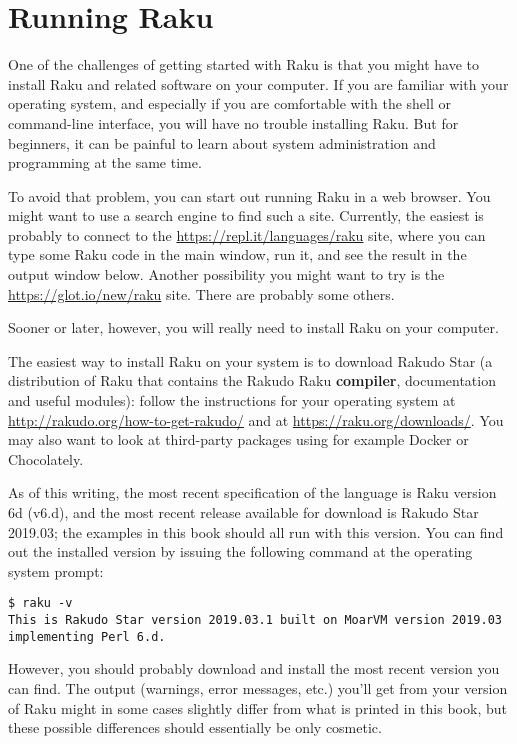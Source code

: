 \section{Running Raku}
\label{running_raku}

One of the challenges of getting started with Raku is that you
might have to install Raku and related software on your computer. 
If you are familiar with your operating system, and especially
if you are comfortable with the shell or command-line interface, 
you will have no trouble installing Raku.  But for beginners, 
it can be painful to learn about system administration and 
programming at the same time.

To avoid that problem, you can start out running Raku 
in a web browser. You might want to use a search engine 
to find such a site. Currently, the easiest is probably 
to connect to the \url{https://repl.it/languages/raku} site, 
where you can type some Raku code in the main window, run 
it, and see the result in the output window below. Another 
possibility you might want to try is the \url{https://glot.io/new/raku} 
site. There are probably some others.

Sooner or later, however, you will really need to install 
Raku on your computer.

The easiest way to install Raku on your system is to 
download Rakudo Star (a distribution of Raku that contains 
the Rakudo Raku {\bf compiler}, documentation and useful modules): 
follow the instructions for your operating system at 
\url{http://rakudo.org/how-to-get-rakudo/} and at 
\url{https://raku.org/downloads/}. You may also want to look at 
third-party packages using for example Docker or Chocolately.

As of this writing, the most recent specification of 
the language is Raku version 6d (v6.d), and the most 
recent release available for download is Rakudo Star 2019.03; 
the examples in this book should 
all run with this version. You can find out the installed 
version by issuing the following command at the operating 
system prompt:
\begin{verbatim}
$ raku -v
This is Rakudo Star version 2019.03.1 built on MoarVM version 2019.03
implementing Perl 6.d.
\end{verbatim}

However, you should probably download and install the most recent 
version you can find. The output (warnings, error messages, 
etc.) you'll get from your version of Raku might in some 
cases slightly differ from what is printed in this book, 
but these possible differences should essentially be 
only cosmetic. 


